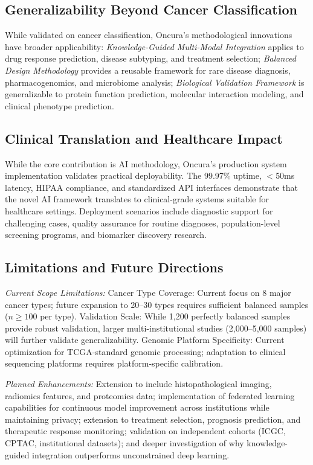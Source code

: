 \documentclass[manuscript, screen, review]{jair}
\begin{document}
\subsection{Generalizability Beyond Cancer Classification}

While validated on cancer classification, Oncura's methodological innovations have broader applicability: \emph{Knowledge-Guided Multi-Modal Integration} applies to drug response prediction, disease subtyping, and treatment selection; \emph{Balanced Design Methodology} provides a reusable framework for rare disease diagnosis, pharmacogenomics, and microbiome analysis; \emph{Biological Validation Framework} is generalizable to protein function prediction, molecular interaction modeling, and clinical phenotype prediction.

\subsection{Clinical Translation and Healthcare Impact}

While the core contribution is AI methodology, Oncura's production system implementation validates practical deployability. The 99.97\% uptime, $<$50ms latency, HIPAA compliance, and standardized API interfaces demonstrate that the novel AI framework translates to clinical-grade systems suitable for healthcare settings. Deployment scenarios include diagnostic support for challenging cases, quality assurance for routine diagnoses, population-level screening programs, and biomarker discovery research.

\subsection{Limitations and Future Directions}

\emph{Current Scope Limitations:} Cancer Type Coverage: Current focus on 8 major cancer types; future expansion to 20--30 types requires sufficient balanced samples ($n \geq 100$ per type). Validation Scale: While 1,200 perfectly balanced samples provide robust validation, larger multi-institutional studies (2,000--5,000 samples) will further validate generalizability. Genomic Platform Specificity: Current optimization for TCGA-standard genomic processing; adaptation to clinical sequencing platforms requires platform-specific calibration.

\emph{Planned Enhancements:} Extension to include histopathological imaging, radiomics features, and proteomics data; implementation of federated learning capabilities for continuous model improvement across institutions while maintaining privacy; extension to treatment selection, prognosis prediction, and therapeutic response monitoring; validation on independent cohorts (ICGC, CPTAC, institutional datasets); and deeper investigation of why knowledge-guided integration outperforms unconstrained deep learning.
\end{document}

